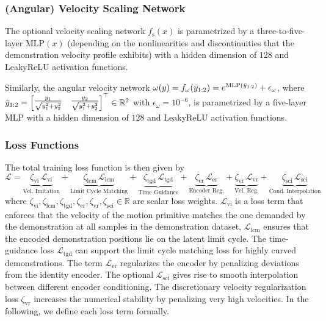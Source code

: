 \subsubsection{(Angular) Velocity Scaling Network}
The optional velocity scaling network $f_\mathrm{s}(x)$ is parametrized by a three-to-five-layer $\mathrm{MLP}(x)$ (depending on the nonlinearities and discontinuities that the demonstration velocity profile exhibits) with a hidden dimension of $128$ and LeakyReLU activation functions.

Similarly, the angular velocity network $\omega(y) = f_\omega(\Bar{y}_{1:2}) = e^{\mathrm{MLP}(\Bar{y}_{1:2})} + \epsilon_\omega$, where $\Bar{y}_{1:2} = \begin{bmatrix}
    \frac{y_1}{\sqrt{y_1^2+y_2^2}} &  \frac{y_2}{\sqrt{y_1^2+y_2^2}}
\end{bmatrix}^\top \in \mathbb{R}^2$ with $\epsilon_\omega = 10^{-6}$, is parametrized by a five-layer MLP with a hidden dimension of $128$ and LeakyReLU activation functions.

\subsubsection{Loss Functions}
The total training loss function is then given by
\begin{equation}
    \mathcal{L} = \underbrace{\zeta_\mathrm{vi} \, \mathcal{L}_\mathrm{vi}}_\text{Vel. Imitation} + \underbrace{\zeta_\mathrm{lcm} \, \mathcal{L}_\mathrm{lcm}}_\text{Limit Cycle Matching} + \underbrace{\zeta_\mathrm{tgd} \, \mathcal{L}_\mathrm{tgd}}_\text{Time Guidance} 
    + \underbrace{\zeta_\mathrm{er} \, \mathcal{L}_{\mathrm{er}}}_\text{Encoder Reg.}
    + \underbrace{\zeta_\mathrm{vr} \, \mathcal{L}_{\mathrm{vr}}}_\text{Vel. Reg.}  + \underbrace{\zeta_\mathrm{sci} \, \mathcal{L}_{\mathrm{sci}}}_\text{Cond. Interpolation} 
\end{equation}
where $\zeta_\mathrm{vi}, \zeta_\mathrm{lcm}, \zeta_\mathrm{tgd}, \zeta_\mathrm{er}, \zeta_\mathrm{vr}, \zeta_\mathrm{sci} \in \mathbb{R}$ are scalar loss weights.
$\mathcal{L}_\mathrm{vi}$ is a loss term that enforces that the velocity of the motion primitive matches the one demanded by the demonstration at all samples in the demonstration dataset, $\mathcal{L}_\mathrm{lcm}$ ensures that the encoded demonstration positions lie on the latent limit cycle. The time-guidance loss $\mathcal{L}_\mathrm{tgd}$ can support the limit cycle matching loss for highly curved demonstrations. 
The term $\mathcal{L}_\mathrm{er}$ regularizes the encoder by penalizing deviations from the identity encoder.
The optional $\mathcal{L}_{\mathrm{sci}}$ gives rise to smooth interpolation between different encoder conditioning.
The discretionary velocity regularization loss $\zeta_\mathrm{vr}$ increases the numerical stability by penalizing very high velocities. In the following, we define each loss term formally.

